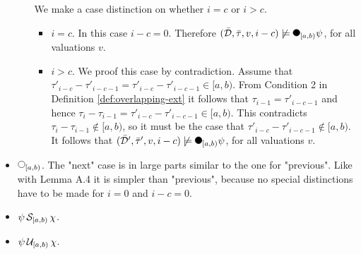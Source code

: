 \begin{itemize}
\begin{itemize}
                We make a case distinction on whether $i=c$ or $i>c$.
                \begin{itemize}
                    \item
                        $i=c$.
                        In this case $i-c = 0$.
                        Therefore $(\bar{\mathcal{D}}, \bar{\tau}, v, i-c) \not\models \Previous{[a,b)} \psi$, for all valuations $v$.
                    \item
                        $i>c$.
                        We proof this case by contradiction.
                        Assume that $\tau'_{i-c} - \tau'_{i-c-1} = \tau'_{i-c} - \tau'_{i-c-1} \in [a,b)$.
                        From Condition 2 in Definition \ref{def:overlapping-ext} it follows that $\tau_{i-1} = \tau'_{i-c-1}$ and hence $\tau_i - \tau_{i-1} = \tau'_{i-c} - \tau'_{i-c-1} \in [a,b)$.
                        This contradicts $\tau_i - \tau_{i-1} \not\in [a,b)$, so it must be the case that $\tau'_{i-c} - \tau'_{i-c-1} \not\in [a,b)$.
                        It follows that $(\bar{\mathcal{D}}', \bar{\tau}', v, i-c) \not\models \Previous{[a,b)} \psi$, for all valuations $v$.
                \end{itemize}
        \end{itemize}
    \item
        $\Next{[a,b)}$.
        The "next" case is in large parts similar to the one for "previous".
        Like with Lemma A.4 \cite{Basin2016} it is simpler than "previous", because no special distinctions have to be made for $i=0$ and $i-c=0$.
    \item
        $\psi \,\mathcal{S}_{[a,b)}\, \chi$.
    \item
        $\psi \,\mathcal{U}_{[a,b)}\, \chi$.
\end{itemize}





